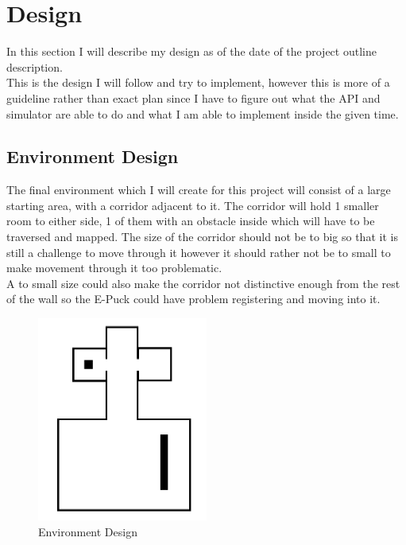 \chapter{Design}

In this section I will describe my design as of the date of the project outline description. \\
This is the design I will follow and try to implement, however this is more of a guideline rather than exact plan since I have to figure out what the API and simulator are able to do and what I am able to implement inside the given time.\\

\section{Environment Design}
The final environment which I will create for this project will consist of a large starting area, with a corridor adjacent to it. The corridor will hold 1 smaller room to either side, 1 of them with an obstacle inside which will have to be traversed and mapped. The size of the corridor should not be to big so that it is still a challenge to move through it however it should rather not be to small to make movement through it too problematic. \\
A to small size could also make the corridor not distinctive enough from the rest of the wall so the E-Puck could have problem registering and moving into it.\\

\begin{figure}[h]
\centering
\includegraphics[width=0.5\textwidth]{../../figures/environment_example.png} 
\caption{Environment Design}
\label{Figure 2}
\end{figure}

